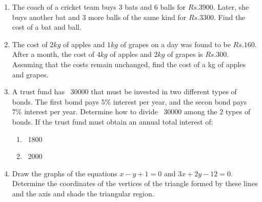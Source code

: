 \begin{enumerate}[label=\thesubsection.\arabic*,ref=\thesubsection.\theenumi]
\item The coach of a cricket team buys $3$ bats and $6$ balls for $Rs.3900$. Later, she buys another bat and $3$ more balls of the same kind for $Rs.3300$. Find the cost of a bat and ball.
\item The cost of $2kg$ of apples and $1kg$ of grapes on a day was found to be $Rs.160$. After a month, the cost of $4kg$ of apples and $2kg$ of grapes is $Rs.300$. Assuming that the costs remain unchanged, find the cost of a kg of apples and grapes. 
\item A trust fund has \rupee~30000 that must be invested in two different types of bonds. The first bomd pays $5\%$  interest per year, and the secon bond pays $7\%$ interest per year.  Determine how to divide \rupee~30000 among the $2$ types of bonds. If the trust fund must obtain an annual total interest of:
\begin{enumerate}
\item \rupee~1800
\item \rupee~2000
\end{enumerate}
\item Draw the graphs of the equations $x-y+1=0$ and $3x+2y-12=0$. Determine the coordinates of the vertices of the triangle formed by these lines and the axis and shade the triangular region.
\end{enumerate}
